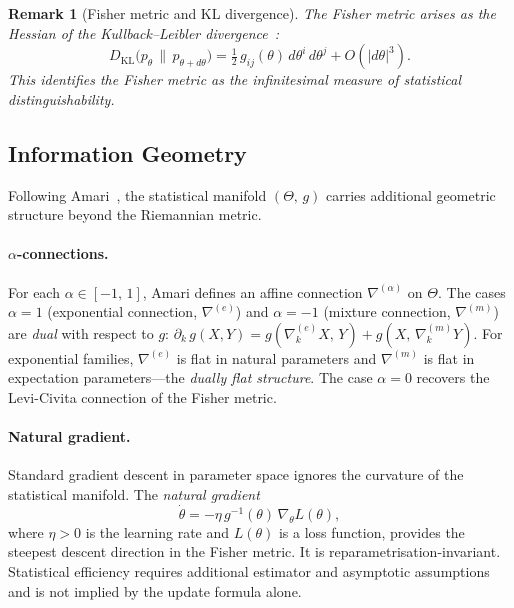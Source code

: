 \documentclass[12pt,a4paper,openany]{book}
\newtheorem{remark}[theorem]{Remark}
\begin{document}
\begin{remark}[Fisher metric and KL divergence]
\label{T-III-rem:fisher_KL}
The Fisher metric arises as the Hessian of the
Kullback--Leibler divergence~\cite{CoverThomas2006}:
\begin{equation}
\label{T-III-eq:fisher_KL}
D_{\mathrm{KL}}\bigl(p_\theta \,\|\, p_{\theta+d\theta}\bigr)
= \tfrac{1}{2}\,g_{ij}(\theta)\,d\theta^i\,d\theta^j
  + O\!\left(|d\theta|^3\right).
\end{equation}
This identifies the Fisher metric as the infinitesimal
measure of statistical distinguishability.
\end{remark}

\subsection{Information Geometry}
\label{T-III-subsec:info_geom}

Following Amari~\cite{Amari1985,AmariNagaoka2000}, the
statistical manifold $(\Theta,\,g)$ carries additional
geometric structure beyond the Riemannian metric.

\paragraph{$\alpha$-connections.}
For each $\alpha \in [-1,\,1]$, Amari defines an affine
connection $\nabla^{(\alpha)}$ on $\Theta$.
The cases $\alpha = 1$ (exponential connection,
$\nabla^{(e)}$) and $\alpha = -1$ (mixture connection,
$\nabla^{(m)}$) are \emph{dual} with respect to $g$:
$\partial_k\,g(X,Y)
= g(\nabla_k^{(e)}X,\,Y)
+ g(X,\,\nabla_k^{(m)}Y)$.
For exponential families, $\nabla^{(e)}$ is flat in natural
parameters and $\nabla^{(m)}$ is flat in expectation
parameters---the \emph{dually flat structure}.
The case $\alpha = 0$ recovers the Levi-Civita connection of
the Fisher metric.

\paragraph{Natural gradient.}
Standard gradient descent in parameter space ignores the
curvature of the statistical manifold.
The \emph{natural gradient}~\cite{Amari1998}
\begin{equation}
\label{T-III-eq:natural_gradient}
\dot{\theta}
= -\eta\,g^{-1}(\theta)\,\nabla_\theta L(\theta),
\end{equation}
where $\eta > 0$ is the learning rate and $L(\theta)$ is a
loss function, provides the steepest descent direction in the
Fisher metric.
It is reparametrisation-invariant.  Statistical efficiency requires
additional estimator and asymptotic assumptions and is not implied by
the update formula alone.
\end{document}
